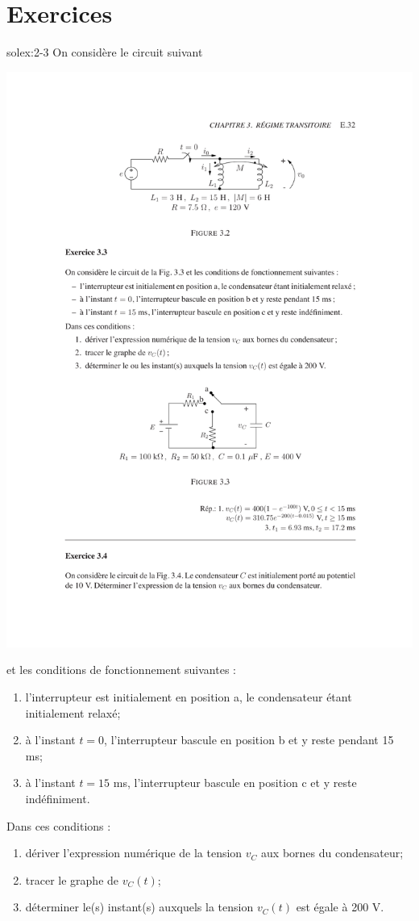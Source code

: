 
\section{Exercices}

\begin{exwithsol}{}{solex:2-3}
	\label{ex:2-3}
On consid\`ere le circuit suivant 
\begin{center}
	\includegraphics[width=0.85\linewidth]{exercices/ex-3-3}
\end{center}
et les conditions de fonctionnement suivantes :
\begin{enumerate}
	\item l'interrupteur est initialement en position a, le condensateur
	\'etant initialement relax\'e;
	\item \`a l'instant  $t=0$, l'interrupteur bascule en position b et y reste pendant 15 ms;
	\item \`a l'instant  $t=15$ ms, l'interrupteur bascule en position c et y reste ind\'efiniment. 
\end{enumerate}
Dans ces conditions :
\begin{enumerate}
	\item d\'eriver l'expression num\'erique de la tension $v_C$ aux bornes du condensateur;
	\item tracer le graphe de $v_C(t)$;
	\item d\'eterminer le(s) instant(s) auxquels la tension $v_C(t)$ est \'egale \`a 200 V.
\end{enumerate}
\end{exwithsol}

